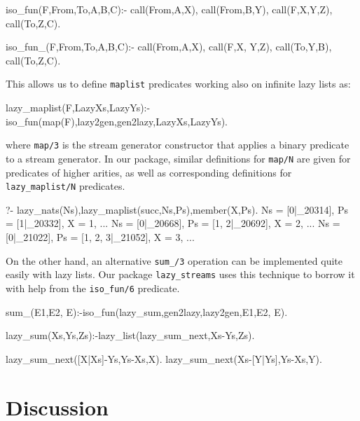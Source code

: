 \documentclass{new_tlp}
\begin{document}
\begin{codeh}
%
iso_fun(F,From,To,A,B,C):-
  call(From,A,X),
  call(From,B,Y),
  call(F,X,Y,Z),
  call(To,Z,C).

%
iso_fun_(F,From,To,A,B,C):- 
  call(From,A,X),
  call(F,X, Y,Z), %
  call(To,Y,B),
  call(To,Z,C).
\end{codeh}


This allows us to define {\tt maplist} predicates working also
on infinite lazy lists as:

\begin{code}
lazy_maplist(F,LazyXs,LazyYs):-iso_fun(map(F),lazy2gen,gen2lazy,LazyXs,LazyYs).
\end{code}
where {\tt map/3} is the stream generator constructor that applies a binary
predicate to a stream generator. In our package, similar definitions for {\tt map/N}
are given for predicates of higher arities, as well as corresponding definitions for
{\tt lazy\_maplist/N} predicates.

\BX
\begin{codex}
?- lazy_nats(Ns),lazy_maplist(succ,Ns,Ps),member(X,Ps).
Ns = [0|_20314], Ps = [1|_20332], X = 1,
...
Ns = [0|_20668], Ps = [1, 2|_20692], X = 2,
...
Ns = [0|_21022], Ps = [1, 2, 3|_21052], X = 3,
...
\end{codex}
\EX

On the other hand, an alternative {\tt sum\_/3} operation  can be implemented 
quite easily with lazy lists. Our package {\tt lazy\_streams} 
uses this technique to borrow it with help from the {\tt iso\_fun/6} predicate.
\begin{code}
sum_(E1,E2, E):-iso_fun(lazy_sum,gen2lazy,lazy2gen,E1,E2, E).

lazy_sum(Xs,Ys,Zs):-lazy_list(lazy_sum_next,Xs-Ys,Zs).
  
lazy_sum_next([X|Xs]-Ys,Ys-Xs,X).
lazy_sum_next(Xs-[Y|Ys],Ys-Xs,Y).
\end{code}

\section{Discussion}\label{disc}
\end{document}
